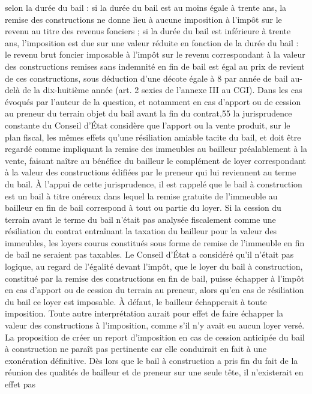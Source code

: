 \documentclass[11pt,a4paper]{report}
\begin{document}
	selon la durée du bail : si la durée du bail est au moins égale à trente ans, la remise des constructions ne donne
	lieu à aucune imposition à l'impôt sur le revenu au titre des revenus fonciers ; si la durée du bail est inférieure à
	trente ans, l'imposition est due sur une valeur réduite en fonction de la durée du bail : le revenu brut foncier
	imposable à l'impôt sur le revenu correspondant à la valeur des constructions remises sans indemnité en fin de
	bail est égal au prix de revient de ces constructions, sous déduction d'une décote égale à 8 par année de bail au-
	delà de la dix-huitième année (art. 2 sexies de l'annexe III au CGI). Dans les cas évoqués par l'auteur de la
	question, et notamment en cas d'apport ou de cession au preneur du terrain objet du bail avant la fin du contrat,55
	la jurisprudence constante du Conseil d'État considère que l'apport ou la vente produit, sur le plan fiscal, les
	mêmes effets qu'une résiliation amiable tacite du bail, et doit être regardé comme impliquant la remise des
	immeubles au bailleur préalablement à la vente, faisant naître au bénéfice du bailleur le complément de loyer
	correspondant à la valeur des constructions édifiées par le preneur qui lui reviennent au terme du bail. À l'appui
	de cette jurisprudence, il est rappelé que le bail à construction est un bail à titre onéreux dans lequel la remise
	gratuite de l'immeuble au bailleur en fin de bail correspond à tout ou partie du loyer. Si la cession du terrain
	avant le terme du bail n'était pas analysée fiscalement comme une résiliation du contrat entraînant la taxation
	du bailleur pour la valeur des immeubles, les loyers courus constitués sous forme de remise de l'immeuble en fin
	de bail ne seraient pas taxables. Le Conseil d'État a considéré qu'il n'était pas logique, au regard de l'égalité
	devant l'impôt, que le loyer du bail à construction, constitué par la remise des constructions en fin de bail,
	puisse échapper à l'impôt en cas d'apport ou de cession du terrain au preneur, alors qu'en cas de résiliation du
	bail ce loyer est imposable. À défaut, le bailleur échapperait à toute imposition. Toute autre interprétation aurait
	pour effet de faire échapper la valeur des constructions à l'imposition, comme s'il n'y avait eu aucun loyer versé.
	La proposition de créer un report d'imposition en cas de cession anticipée du bail à construction ne paraît pas
	pertinente car elle conduirait en fait à une exonération définitive. Dès lors que le bail à construction a pris fin
	du fait de la réunion des qualités de bailleur et de preneur sur une seule tête, il n'existerait en effet pas
\end{document}
